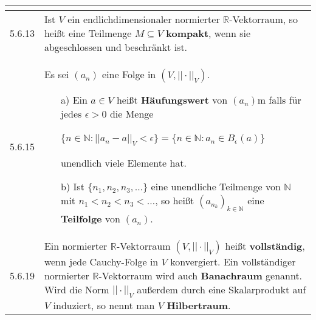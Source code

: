 \begin{table}[H]
\begin{tabularx}{\textwidth}{X m{16cm}}
\begin{itemize}[topsep=-0.5cm]
            \end{itemize} \vspace{-0cm} \\
    \midrule
    5.6.13& Ist $V$ ein endlichdimensionaler normierter $\mathbb{R}$-Vektorraum, so hei\ss t eine Teilmenge $M \subseteq V$
            \textbf{kompakt}, wenn sie abgeschlossen und beschränkt ist. \\
    \midrule
    5.6.15& Es sei $(a_n)$ eine Folge in $(V, ||\cdot||_V)$.
            \begin{itemize}[topsep=-0.5cm]
                \item[a)] Ein $a \in V$ hei\ss t \textbf{Häufungswert} von $(a_n)$m falls für jedes $\epsilon > 0$ die Menge \hfill \break
                            \centerline{\{$n \in \mathbb{N} : ||a_n - a||_V < \epsilon\} = \{n \in \mathbb{N}: a_n \in B_{\epsilon}(a)\}$}
                            unendlich viele Elemente hat.
                \item[b)] Ist $\{n_1,n_2,n_3,\dots\}$ eine unendliche Teilmenge von $\mathbb{N}$ mit $n_1 < n_2 < n_3 < \dots$, so
                            hei\ss t $(a_{n_k})_{k \in \mathbb{N}}$ eine \textbf{Teilfolge} von $(a_n)$. 
            \end{itemize} \vspace{-0cm} \\
    \midrule
    5.6.19& Ein normierter $\mathbb{R}$-Vektorraum $(V, ||\cdot||_V)$ heißt \textbf{vollständig}, wenn jede Cauchy-Folge in $V$ konvergiert.
            Ein vollständiger normierter $\mathbb{R}$-Vektorraum wird auch \textbf{Banachraum} genannt. \hfill \break
            Wird die Norm $||\cdot||_V$ außerdem durch eine Skalarprodukt auf $V$ induziert, so nennt man $V$ \textbf{Hilbertraum}. \\


    \bottomrule

\end{tabularx}
\end{table}

\pagebreak


